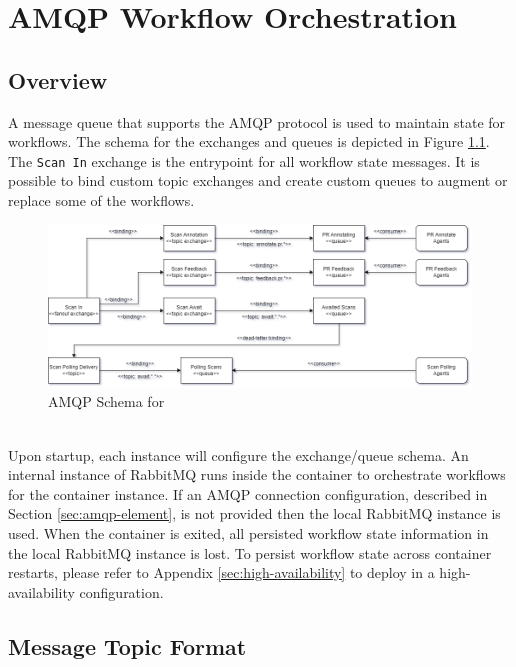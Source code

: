 \chapter{AMQP Workflow Orchestration}\label{sec:amqp-workflow-orch}



\section{Overview}

A message queue that supports the AMQP protocol is used to maintain state for \cxoneflow
workflows.  The schema for the exchanges and queues is depicted in Figure \ref{fig:amqp-schema}.
The \texttt{Scan In} exchange is the entrypoint for all workflow state messages.  It is possible
to bind custom topic exchanges and create custom queues to augment or replace some of the
workflows.


\begin{figure}[h]
    \includegraphics[width=\textwidth]{graphics/cxoneflow-diagrams-Queue.png}
    \caption{AMQP Schema for \cxoneflow}
    \label{fig:amqp-schema}
\end{figure}


\noindent\\Upon startup, each \cxoneflow instance will configure the exchange/queue schema.  An
internal instance of RabbitMQ runs inside the \cxoneflow container to orchestrate
workflows for the container instance.  If an AMQP connection configuration, described in
Section \ref{sec:amqp-element}, is not provided then the local RabbitMQ instance is
used.  When the container is exited, all persisted workflow state information in the local
RabbitMQ instance is lost.  To persist workflow state across container restarts, please
refer to Appendix \ref{sec:high-availability} to deploy \cxoneflow in a
high-availability configuration.

\section{Message Topic Format}

